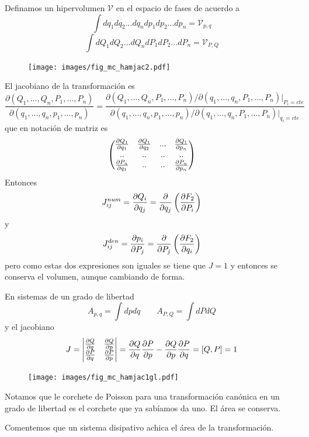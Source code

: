 \documentclass[10pt,oneside]{CBFT_book}
\begin{document}
Definamos un hipervolumen $\mathcal{V}$ en el espacio de fases de acuerdo a
\[
	\int dq_1 dq_2 ... dq_n dp_1 dp_2 ... dp_n = \mathcal{V}_{p,q}
\]
\[
	\int dQ_1 dQ_2 ... dQ_n dP_1 dP_2 ... dP_n = \mathcal{V}_{P,Q}
\]
\begin{figure}
	\begin{center}
	\texttt{[image: images/fig\_mc\_hamjac2.pdf]}	 
	\end{center}
	\caption{}
\end{figure} 
El jacobiano de la transformación es 
\[
	\frac{\partial (Q_1,...,Q_n,P_1,...,P_n)}{\partial (q_1,...,q_n,p_1,...,p_n)} =
	\frac{\partial (Q_1,...,Q_n,P_1,...,P_n)/\partial (q_1,...,q_n,P_1,...,P_n)|_{P_i=cte}}
	{\partial (q_1,...,q_n,p_1,...,p_n)/\partial (q_1,...,q_n,P_1,...,P_n)|_{q_i=cte}}
\]
que en notación de matriz es 
\[
	\begin{pmatrix}
	\dpar{Q_1}{q_1} & \dpar{Q_1}{q_2} & ... & \dpar{Q_1}{p_n} \\
	.. & .. & .. & .. \\
	\dpar{P_n}{q_1} & .. & .. & \dpar{P_n}{p_n}
	\end{pmatrix}
\]
Entonces 
\[
	J_{ij}^{num} = \dpar{Q_i}{q_j} = \frac{\partial}{\partial q_j} \left(\dpar{F_2}{P_i} \right)
\]
y
\[
	J_{ij}^{den} = \dpar{p_i}{P_j} = \frac{\partial}{\partial P_j} \left(\dpar{F_2}{q_i} \right)
\]
pero como estas dos expresiones son iguales se tiene que $J=1$ y entonces se conserva
el volumen, aunque cambiando de forma.

En sistemas de un grado de libertad
\[
	A_{p,q} = \int dp dq \qquad A_{P,Q} = \int dP dQ
\]
y el jacobiano
\[
	J = \begin{vmatrix}
	     \dpar{Q}{q} & \dpar{Q}{p} \\
	     \dpar{P}{q} & \dpar{P}{p}
	    \end{vmatrix} =
	    \dpar{Q}{q} \dpar{P}{p} - \dpar{Q}{p} \dpar{P}{q} = [Q, P] = 1
\]
\begin{figure}
	\begin{center}
	\texttt{[image: images/fig\_mc\_hamjac1gl.pdf]}	 
	\end{center}
	\caption{}
\end{figure} 
Notamos que le corchete de Poisson para una transformación canónica en un grado de
libertad es el corchete que ya sabíamos da uno. El área se conserva.

Comentemos que un sistema disipativo achica el área de la transformación.

\end{document}

